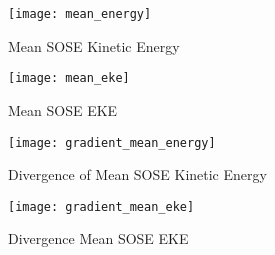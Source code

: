 \documentclass[english]{article}
\begin{document}
\begin{figure}
\caption{Mean SOSE Kinetic Energy}
\texttt{[image: mean\_energy]}
\label{fig:sose_kinetic_energy}
\end{figure}

\begin{figure}
\caption{Mean SOSE EKE}
\texttt{[image: mean\_eke]}
\label{fig:sose_EKE}
\end{figure}

\begin{figure}
\caption{Divergence of Mean SOSE Kinetic Energy}
\texttt{[image: gradient\_mean\_energy]}
\label{fig:sose_gradient_kinetic_energy}
\end{figure}

\begin{figure}
\caption{Divergence Mean SOSE EKE}
\texttt{[image: gradient\_mean\_eke]}
\label{fig:sose_gradient_EKE}
\end{figure}
\end{document}
